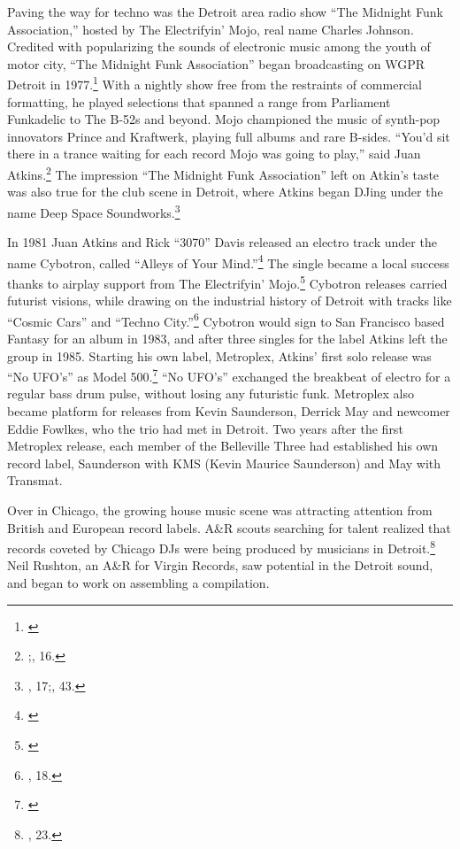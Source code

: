 \documentclass[12pt,twoside]{reedthesis}
\begin{document}
Paving the way for techno was the Detroit area radio show ``The Midnight Funk Association,'' hosted by The Electrifyin' Mojo, real name Charles Johnson. Credited with popularizing the sounds of electronic music among the youth of motor city, ``The Midnight Funk Association'' began broadcasting on WGPR Detroit in 1977.\footnote{\cite{zlatopolskyTheaterMindLegacy2015}} With a nightly show free from the restraints of commercial formatting, he played selections that spanned a range from Parliament Funkadelic to The B-52s and beyond. Mojo championed the music of synth-pop innovators Prince and Kraftwerk, playing full albums and rare B-sides. ``You’d sit there in a trance waiting for each record Mojo was going to play,'' said Juan Atkins.\footnote{\cite{zlatopolskyTheaterMindLegacy2015};\cite{reynoldsGenerationEcstasyWorld1998}, 16.} The impression ``The Midnight Funk Association'' left on Atkin's taste was also true for the club scene in Detroit, where Atkins began DJing under the name Deep Space Soundworks.\footnote{\cite{reynoldsGenerationEcstasyWorld1998}, 17;\cite{sickoTechnoRebelsRenegades2010}, 43.}

In 1981 Juan Atkins and Rick ``3070'' Davis released an electro track under the name Cybotron, called ``Alleys of Your Mind.''\footnote{\cite{cybotronAlleysYourMind1981}} The single became a local success thanks to airplay support from The Electrifyin' Mojo.\footnote{\cite{zlatopolskyTheaterMindLegacy2015}} Cybotron releases carried futurist visions, while drawing on the industrial history of Detroit with tracks like ``Cosmic Cars'' and ``Techno City.''\footnote{\cite{reynoldsGenerationEcstasyWorld1998}, 18.} Cybotron would sign to San Francisco based Fantasy for an album in 1983, and after three singles for the label Atkins left the group in 1985. Starting his own label, Metroplex, Atkins' first solo release was ``No UFO's'' as Model 500.\footnote{\cite{model500NoUFO1985}} ``No UFO's'' exchanged the breakbeat of electro for a regular bass drum pulse, without losing any futuristic funk. Metroplex also became platform for releases from Kevin Saunderson, Derrick May and newcomer Eddie Fowlkes, who the trio had met in Detroit. Two years after the first Metroplex release, each member of the Belleville Three had established his own record label, Saunderson with KMS (Kevin Maurice Saunderson) and May with Transmat.

Over in Chicago, the growing house music scene was attracting attention from British and European record labels. A{\&}R scouts searching for talent realized that records coveted by Chicago DJs were being produced by musicians in Detroit.\footnote{\cite{reynoldsGenerationEcstasyWorld1998}, 23.} Neil Rushton, an A{\&}R for Virgin Records, saw potential in the Detroit sound, and began to work on assembling a compilation.
\end{document}
